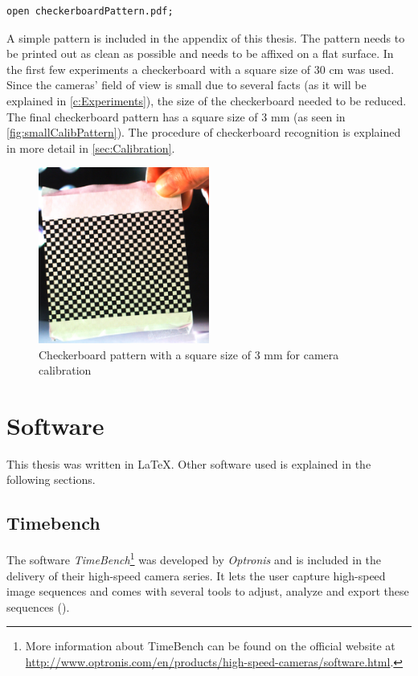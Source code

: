 \begin{lstlisting}
open checkerboardPattern.pdf;
\end{lstlisting}

A simple pattern is included in the appendix of this thesis. The pattern needs to be printed out as clean as possible and needs to be affixed on a flat surface. In the first few experiments a checkerboard with a square size of 30 cm was used. Since the cameras' field of view is small due to several facts (as it will be explained in \autoref{c:Experiments}), the size of the checkerboard needed to be reduced. The final checkerboard pattern has a square size of 3 mm (as seen in \autoref{fig:smallCalibPattern}). The procedure of checkerboard recognition is explained in more detail in \autoref{sec:Calibration}.  

\begin{figure}[htbp]
		\centering
		\includegraphics[width=0.5\textwidth]{figures/smallCalibPattern}
		\caption[Checkerboard pattern for camera calibration]{Checkerboard pattern with a square size of 3 mm for camera calibration}
		\label{fig:smallCalibPattern}
\end{figure}

\section{Software} \label{sec:Software}
This thesis was written in \LaTeX . Other software used is explained in the following sections.

\subsection{Timebench} \label{ssec:Timebench}
The software \textit{TimeBench}\footnote{More information about TimeBench can be found on the official website at \url{http://www.optronis.com/en/products/high-speed-cameras/software.html}.} was developed by \textit{Optronis} and is included in the delivery of their high-speed camera series. It lets the user capture high-speed image sequences and comes with several tools to adjust, analyze and export these sequences (\cite{Optronis.2016}). 

